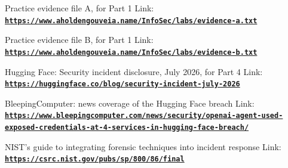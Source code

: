 \documentclass[12pt]{article}
\begin{document}
Practice evidence file A, for Part 1
Link: \href{https://www.aholdengouveia.name/InfoSec/labs/evidence-a.txt}{\textbf{\nolinkurl{https://www.aholdengouveia.name/InfoSec/labs/evidence-a.txt}}}

Practice evidence file B, for Part 1
Link: \href{https://www.aholdengouveia.name/InfoSec/labs/evidence-b.txt}{\textbf{\nolinkurl{https://www.aholdengouveia.name/InfoSec/labs/evidence-b.txt}}}

Hugging Face: Security incident disclosure, July 2026, for Part 4
Link: \href{https://huggingface.co/blog/security-incident-july-2026}{\textbf{\nolinkurl{https://huggingface.co/blog/security-incident-july-2026}}}

BleepingComputer: news coverage of the Hugging Face breach
Link: \href{https://www.bleepingcomputer.com/news/security/openai-agent-used-exposed-credentials-at-4-services-in-hugging-face-breach/}{\textbf{\nolinkurl{https://www.bleepingcomputer.com/news/security/openai-agent-used-exposed-credentials-at-4-services-in-hugging-face-breach/}}}

NIST's guide to integrating forensic techniques into incident response
Link: \href{https://csrc.nist.gov/pubs/sp/800/86/final}{\textbf{\nolinkurl{https://csrc.nist.gov/pubs/sp/800/86/final}}}
\end{document}
